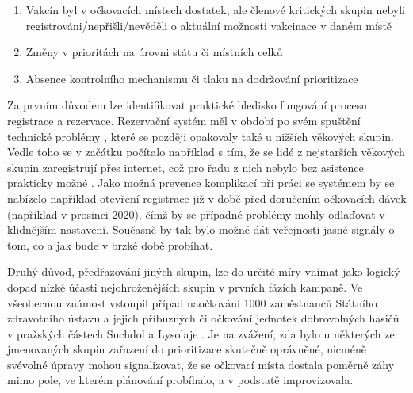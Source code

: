 \begin{enumerate}
\item Vakcín byl v očkovacích místech dostatek, ale členové kritických skupin nebyli registrováni/nepřišli/nevěděli o aktuální možnosti vakcinace v daném místě \cite{logo_nahoda, lochar_karban} 
\item Změny v prioritách na úrovni státu či místních celků \cite{logo_logistika, logo_pardubice}
\item Absence kontrolního mechanismu či tlaku na dodržování prioritizace \cite{logo_predbihani, lochar_karban}
\end{enumerate}


Za prvním důvodem lze identifikovat praktické hledisko fungování procesu registrace a rezervace.
Rezervační systém měl v období po svém spuštění technické problémy \cite{logoc_seniori_zapsani, logoc_stres}, které se později opakovaly také u nižších věkových skupin. 
Vedle toho se v začátku počítalo například s tím, že se lidé z nejstarších věkových skupin zaregistrují přes internet, což pro řadu z nich nebylo bez asistence prakticky možné \cite{seniori_registrace_internet}.
%
Jako možná prevence komplikací při práci se systémem by se nabízelo například otevření registrace již v době před doručením očkovacích dávek (například v prosinci 2020), čímž by se případné problémy mohly odlaďovat v klidnějším nastavení. %
Současně by tak bylo možné dát veřejnosti jasné signály o tom, co a jak bude v brzké době probíhat.

Druhý důvod, předřazování jiných skupin, lze do určité míry vnímat jako logický dopad nízké účasti nejohroženějších skupin v prvních fázích kampaně.
%
Ve všeobecnou známost vstoupil případ naočkování 1000 zaměstnanců Státního zdravotního ústavu a jejich příbuzných či očkování jednotek dobrovolných hasičů v pražských částech Suchdol a Lysolaje \cite{logoc_nebudu, logoc_hasici}. Je na zvážení, zda bylo u některých ze jmenovaných skupin zařazení do prioritizace skutečně oprávněné, nicméně svévolné úpravy mohou signalizovat, že se očkovací místa dostala poměrně záhy mimo pole, ve kterém plánování probíhalo, a v podstatě improvizovala. 

